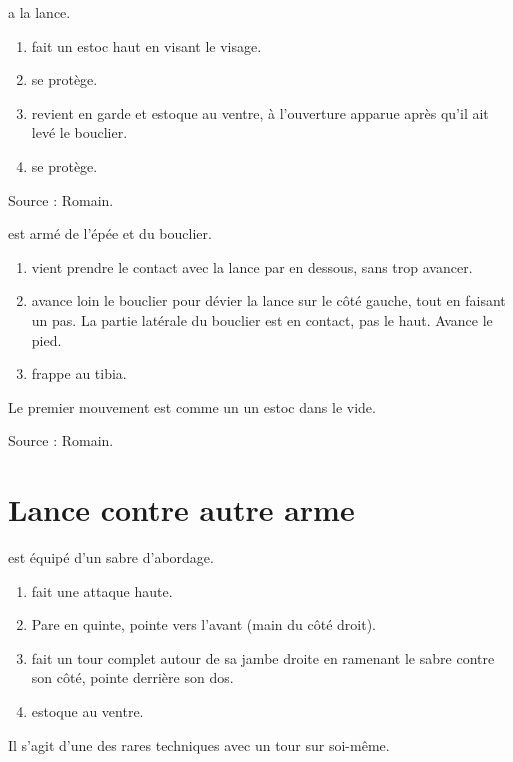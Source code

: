 \begin{exercice}
\A a la lance.

\begin{enumerate}
	\item \A fait un estoc haut en visant le visage.
	
	\item \D se protège.
	
	\item \A revient en garde et estoque \D au ventre, à l'ouverture apparue après qu'il ait levé le bouclier.
	
	\item \D se protège.
\end{enumerate}

Source : Romain.
\end{exercice}



\begin{technique}
\A est armé de l'épée et du bouclier.

\begin{enumerate}
	\item \A vient prendre le contact avec la lance par en dessous, sans trop avancer.
	
	\item \A avance loin le bouclier pour dévier la lance sur le côté gauche, tout en faisant un pas. La partie latérale du bouclier est en contact, pas le haut. Avance le pied.

	\item \A frappe \D au tibia.
\end{enumerate}

Le premier mouvement est comme un un estoc dans le vide.

Source : Romain.
\end{technique}



\section{Lance contre autre arme}


\begin{technique}
\D est équipé d'un sabre d'abordage.

\begin{enumerate}
	\item \A fait une attaque haute.
	
	\item \D Pare en quinte, pointe vers l'avant (main du côté droit).
	
	\item \D fait un tour complet autour de sa jambe droite en ramenant le sabre contre son côté, pointe derrière son dos.
	
	\item \D estoque \A au ventre.
\end{enumerate}

Il s'agit d'une des rares techniques avec un tour sur soi-même.
\end{technique}


